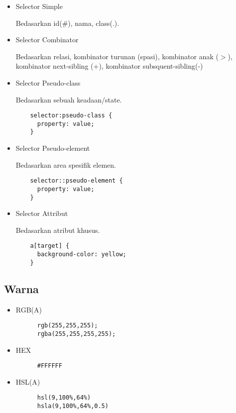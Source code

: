 \documentclass[12pt,a4paper]{article}
\begin{document}
\begin{itemize}
  \item Selector Simple

    Bedasarkan id(#), nama, class(.).

  \item Selector Combinator

    Bedasarkan relasi, kombinator turunan (spasi), kombinator anak ($>$),
    kombinator next-sibling (+), kombinator subsquent-sibling(-)

  \item Selector Pseudo-class

    Bedasarkan sebuah keadaan/state.

    \begin{lstlisting}
    selector:pseudo-class {
      property: value;
    }
    \end{lstlisting}

  \item Selector Pseudo-element

    Bedasarkan area spesifik elemen.

    \begin{lstlisting}
    selector::pseudo-element {
      property: value;
    }
    \end{lstlisting}

  \item Selector Attribut

    Bedasarkan atribut khusus.

    \begin{lstlisting}
    a[target] {
      background-color: yellow;
    }
    \end{lstlisting}

\end{itemize}

\subsection*{Warna}

\begin{itemize}
  \item RGB(A)

    \begin{lstlisting}
      rgb(255,255,255);
      rgba(255,255,255,255);
    \end{lstlisting}

  \item HEX

    \begin{lstlisting}
      #FFFFFF
    \end{lstlisting}

  \item HSL(A)
    \begin{lstlisting}
      hsl(9,100%,64%)
      hsla(9,100%,64%,0.5)
    \end{lstlisting}
\end{itemize}
\end{document}
